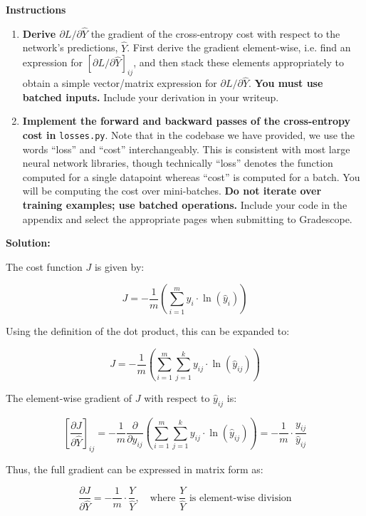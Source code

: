\documentclass{article}
\newenvironment{solution}{\color{blue} \smallskip \textbf{Solution:}}{}
\begin{document}
\textbf{Instructions}
\begin{enumerate}
    \item 
    \textbf{Derive $\partial L/\partial \hat{Y}$} the gradient of the cross-entropy cost with respect to the network's predictions, $\hat{Y}$. 
    First derive the gradient element-wise, i.e. find an expression for $[\partial L/\partial \hat{Y}]_{ij}$, and then stack these elements appropriately to obtain a simple vector/matrix expression for $\partial L/\partial \hat{Y}$. 
    \textbf{You must use batched inputs.} Include your derivation in your writeup.
    
    \item 
    \textbf{Implement the forward and backward passes of the cross-entropy cost in} \texttt{losses.py}. 
    Note that in the codebase we have provided, we use the words ``loss'' and ``cost'' interchangeably. 
    This is consistent with most large neural network libraries, though technically ``loss'' denotes the function computed for a single datapoint whereas ``cost'' is computed for a batch. 
    You will be computing the cost over mini-batches. 
    \textbf{Do not iterate over training examples; use batched operations.} 
    Include your code in the appendix and select the appropriate pages when submitting to Gradescope.
\end{enumerate}

\begin{solution}
    
The cost function \( J \) is given by:

\[
J = -\frac{1}{m} \left( \sum_{i=1}^m y_i \cdot \ln(\hat{y}_i) \right)
\]

Using the definition of the dot product, this can be expanded to:

\[
J = -\frac{1}{m} \left( \sum_{i=1}^m \sum_{j=1}^k y_{ij} \cdot \ln(\hat{y}_{ij}) \right)
\]

The element-wise gradient of \( J \) with respect to \( \hat{y}_{ij} \) is:

\[
\left[ \frac{\partial J}{\partial \hat{Y}} \right]_{ij} = -\frac{1}{m} \frac{\partial}{\partial \hat{y}_{ij}} \left( \sum_{i=1}^m \sum_{j=1}^k y_{ij} \cdot \ln(\hat{y}_{ij}) \right) = -\frac{1}{m} \cdot \frac{y_{ij}}{\hat{y}_{ij}}
\]

Thus, the full gradient can be expressed in matrix form as:

\[
\frac{\partial J}{\partial \hat{Y}} = -\frac{1}{m} \cdot \frac{Y}{\hat{Y}}, \quad \text{where } \frac{Y}{\hat{Y}} \text{ is element-wise division}
\]

\end{solution}
\end{document}
